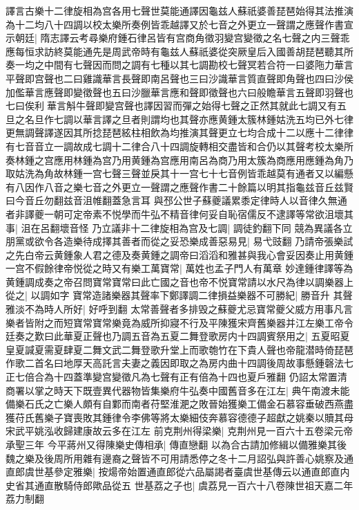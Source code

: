 譯言古樂十二律旋相為宫各用七聲世莫能通譯因龜兹人蘇祇婆善琵琶始得其法推演為十二均八十四調以校太樂所奏例皆乖越譯又於七音之外更立一聲謂之應聲作書宣示朝廷|{
	隋志譯云考尋樂府鍾石律呂皆有宫商角徵羽變宫變徵之名七聲之内三聲乖應每恒求訪終莫能通先是周武帝時有龜兹人蘇祇婆從突厥皇后入國善胡琵琶聽其所奏一均之中間有七聲因而問之調有七種以其七調勘校七聲冥若合符一曰婆陁力華言平聲即宫聲也二曰雞識華言長聲即南呂聲也三曰沙識華言質直聲即角聲也四曰沙侯加儖華言應聲即變徵聲也五曰沙臘華言應和聲即徵聲也六曰般瞻華言五聲即羽聲也七曰俟利華言斛牛聲即變宫聲也譯因習而彈之始得七聲之正然其就此七調又有五旦之名旦作七調以華言譯之旦者則謂均也其聲亦應黄鍾太簇林鍾姑洗五均已外七律更無調聲譯遂因其所捻琵琶絃柱相飲為均推演其聲更立七均合成十二以應十二律律有七音音立一調故成七調十二律合八十四調旋轉相交盡皆和合仍以其聲考校太樂所奏林鍾之宫應用林鍾為宫乃用黄鍾為宫應用南呂為商乃用太簇為商應用應鍾為角乃取姑洗為角故林鍾一宫七聲三聲並戾其十一宫七十七音例皆乖越莫有通者又以編懸有八因作八音之樂七音之外更立一聲謂之應聲作書二十餘篇以明其指龜兹音丘兹賢曰今音丘勿翻兹音沮帷翻蓋急言耳}
與邳公世子蘇夔議累黍定律時人以音律久無通者非譯夔一朝可定帝素不悦學而牛弘不精音律何妥自恥宿儒反不逮譯等常欲沮壞其事|{
	沮在呂翻壞音怪}
乃立議非十二律旋相為宫及七調|{
	調徒釣翻下同}
競為異議各立朋黨或欲令各造樂待成擇其善者而從之妥恐樂成善惡易見|{
	易弋豉翻}
乃請帝張樂試之先白帝云黄鍾象人君之德及奏黄鍾之調帝曰滔滔和雅甚與我心會妥因奏止用黄鍾一宫不假餘律帝悦從之時又有樂工萬寶常|{
	萬姓也孟子門人有萬章}
妙達鍾律譯等為黄鍾調成奏之帝召問寶常寶常曰此亡國之音也帝不悦寶常請以水尺為律以調樂器上從之|{
	以調如字}
寶常造諸樂器其聲率下鄭譯調二律損益樂器不可勝紀|{
	勝音升}
其聲雅淡不為時人所好|{
	好呼到翻}
太常善聲者多排毁之蘇夔尤忌寶常夔父威方用事凡言樂者皆附之而短寶常寶常樂竟為威所抑寢不行及平陳獲宋齊舊樂器并江左樂工帝令廷奏之歎曰此華夏正聲也乃調五音為五夏二舞登歌房内十四調賓祭用之|{
	五夏昭夏皇夏諴夏需夏肆夏二舞文武二舞登歌升堂上而歌匏竹在下貴人聲也帝龍潜時倚琵琶作歌二首名曰地厚天高託言夫妻之義因即取之為房内曲十四調後周故事懸鍾磬法七正七倍合為十四蓋準變宫變徵凡為七聲有正有倍為十四也夏戶雅翻}
仍詔太常置清商署以掌之時天下既壹異代器物皆集樂府牛弘奏中國舊音多在江左|{
	典午南渡未能備樂石氏之亡樂人頗有自鄴而南者苻堅淮淝之敗晉始獲樂工備金石慕容垂破西燕盡獲苻氏舊樂子寶喪敗其鍾律令李佛等將太樂細伎奔慕容德德子超獻之姚秦以贖其母宋武平姚泓收歸建康故云多在江左}
前克荆州得梁樂|{
	克荆州見一百六十五卷梁元帝承聖三年}
今平蔣州又得陳樂史傳相承|{
	傳直戀翻}
以為合古請加修緝以備雅樂其後魏之樂及後周所用雜有邊裔之聲皆不可用請悉停之冬十二月詔弘與許善心姚察及通直郎虞世基參定雅樂|{
	按煬帝始置通直郎從六品屬謁者臺虞世基傳云以通直郎直内史省其通直散騎侍郎歟品從五}
世基荔之子也|{
	虞荔見一百六十八卷陳世祖天嘉二年荔力制翻}
